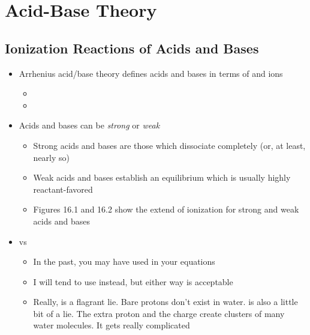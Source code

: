 \documentclass[12pt, openany, letterpaper]{memoir}
\begin{document}
\chapter{Acid-Base Theory}
\section{Ionization Reactions of Acids and Bases}
\begin{itemize}
	\item Arrhenius acid/base theory defines acids and bases in terms of  and  ions
	\begin{itemize}
		\item {}
		\item {}
	\end{itemize}
	\item Acids and bases can be \emph{strong} or \emph{weak}
	\begin{itemize}
		\item Strong acids and bases are those which dissociate completely (or, at least, nearly so) 
		\item Weak acids and bases establish an equilibrium which is usually highly reactant-favored
		\item Figures 16.1 and 16.2 show the extend of ionization for strong and weak acids and bases
	\end{itemize}
	\item {} vs 
	\begin{itemize}
		\item In the past, you may have used  in your equations
		\item I will tend to use  instead, but either way is acceptable
		\item Really,  is a flagrant lie. Bare protons don't exist in water.  is also a little bit of a lie. The extra proton and the charge create clusters of many water molecules. It gets really complicated
	\end{itemize}
\end{itemize}
\end{document}
